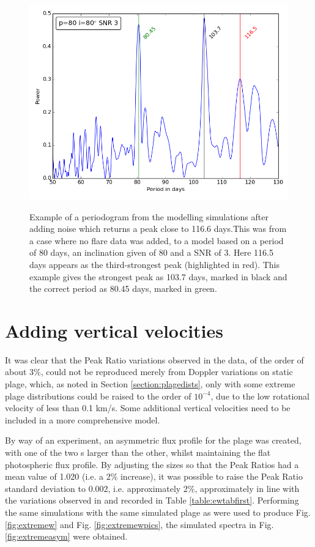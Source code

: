 \begin{figure}[!htbp]
\begin{center}
\includegraphics[scale=0.4]{Figures/badeg.png} \\
\end{center}
\caption{Example of a periodogram from the modelling simulations after adding noise which returns a peak close to 116.6
days.This was from a case where no flare data was added, to a model based on a period of 80 days, an inclination given
of 80{\degree} and a SNR of 3. Here 116.5 days appears as the third-strongest peak (highlighted in red). This example
gives the strongest peak as 103.7 days, marked in black and the correct period as 80.45 days, marked in green.}
\protect\label{fig:rec116}
\end{figure}

\section{Adding vertical velocities}
\protect\label{section:vertvels}

It was clear that the Peak Ratio variations observed in the {\harps} data, of the order of about 3\%, could not be
reproduced merely from Doppler variations on static plage, which, as noted in Section \ref{section:plagedists}, only with
some extreme plage distributions could be raised to the order of $10^{-4}$, due to the low rotational velocity of less than 0.1
km/s.  Some additional vertical velocities need to be included in a more comprehensive model.

By way of an experiment, an asymmetric flux profile for the plage was created, with one of the two \horn s larger than
the other, whilst maintaining the flat photospheric flux profile. By adjusting the sizes so that the Peak Ratios had a
mean value of 1.020 (i.e. a 2\% increase), it was possible to raise the Peak Ratio standard deviation to 0.002,
i.e. approximately 2\%, approximately in line with the variations observed in {\harps} and recorded in Table
\ref{table:ewtabfirst}. Performing the same simulations with the same simulated plage as were used to produce
Fig. \ref{fig:extremew} and Fig. \ref{fig:extremewpics}, the simulated spectra in Fig. \ref{fig:extremeasym} were
obtained.

